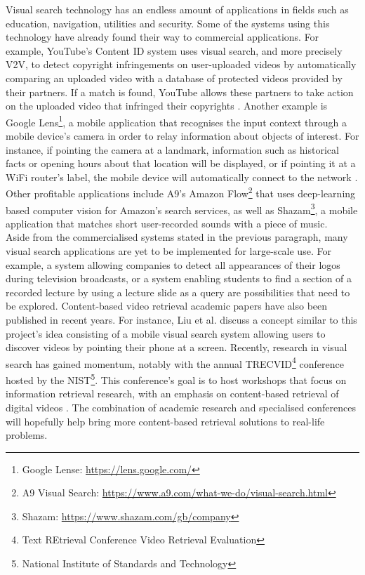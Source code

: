 Visual search technology has an endless amount of applications in fields such as education, navigation, utilities and security. Some of the systems using this technology have already found their way to commercial applications. For example, YouTube's Content ID system uses visual search, and more precisely V2V, to detect copyright infringements on user-uploaded videos by automatically comparing an uploaded video with a database of protected videos provided by their partners. If a match is found, YouTube allows these partners to take action on the uploaded video that infringed their copyrights \cite{youtube-content-id-2012}. Another example is Google Lens\footnote{Google Lense: \url{https://lens.google.com/}}, a mobile application that recognises the input context through a mobile device's camera in order to relay information about objects of interest. For instance, if pointing the camera at a landmark, information such as historical facts or opening hours about that location will be displayed, or if pointing it at a WiFi router's label, the mobile device will automatically connect to the network \cite{villaboas-google-lens2017}. Other profitable applications include A9's Amazon Flow\footnote{A9 Visual Search: \url{https://www.a9.com/what-we-do/visual-search.html}} that uses deep-learning based computer vision for Amazon's search services, as well as Shazam\footnote{Shazam: \url{https://www.shazam.com/gb/company}}, a mobile application that matches short user-recorded sounds with a piece of music.\\

Aside from the commercialised systems stated in the previous paragraph, many visual search applications are yet to be implemented for large-scale use. For example, a system allowing companies to detect all appearances of their logos during television broadcasts, or a system enabling students to find a section of a recorded lecture by using a lecture slide as a query \cite{araujo2017i2v} are possibilities that need to be explored. Content-based video retrieval academic papers have also been published in recent years. For instance, Liu et al. \cite{liu2014mobilevideosearch} discuss a concept similar to this project's idea consisting of a mobile visual search system allowing users to discover videos by pointing their phone at a screen. Recently, research in visual search has gained momentum, notably with the annual TRECVID\footnote{Text REtrieval Conference Video Retrieval Evaluation} conference \cite{2018trecvidawad} hosted by the NIST\footnote{National Institute of Standards and Technology}. This conference's goal is to host workshops that focus on information retrieval research, with an emphasis on content-based retrieval of digital videos \cite{trecvid-general}. The combination of academic research and specialised conferences will hopefully help bring more content-based retrieval solutions to real-life problems.

